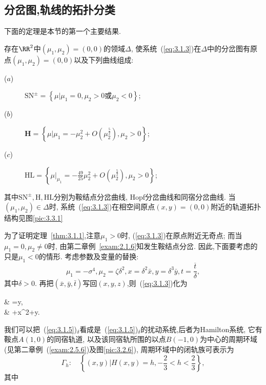 \subsection{分岔图,轨线的拓扑分类}
下面的定理是本节的第一个主要结果.
\begin{theorem}
  \label{thm:3.1.1}
  存在$\RR^2$中$\left(\mu_{1}, \mu_{2}\right)=(0,0)$的领域$\Delta$,
  使系统~(\ref{eq:3.1.3})在$\Delta$中的分岔图有原点$\left(\mu_{1}, \mu_{2}\right)=(0,0)$以及下列曲线组成:
  \begin{description}
  \item[($a$)] $\mathrm{SN}^{ \pm}=\left\{\mu | \mu_{1}=0, \mu_{2}>0 \text {或} \mu_{2}<0\right\}$;
\item[($b$)] $\mathbf{H}=\left\{\mu | \mu_{1}=-\mu_{2}^{2}+O\left(\mu_{2}^{\frac{5}{2}}\right), \mu_{2}>0\right\}$;
\item[($c$)] $\mathrm{HL}=\left\{\left.\mu\right|_{\mu_1}=-\frac{49}{25} \mu_{2}^{2}+O\left(\mu_{2}^{\frac{5}{2}}\right), \mu_{2}>0\right\}$;
\end{description}
其中$\mathrm{SN}^{ \pm}, \mathrm{H}, \mathrm{HL}$分别为鞍结点分岔曲线,
Hopf分岔曲线和同宿分岔曲线.
当$\left(\mu_{1}, \mu_{2}\right) \in \Delta$时,
系统~(\ref{eq:3.1.3})在相空间原点$(x,y)=(0,0)$附近的轨道拓扑结构见图\ref{pic:3.3.1}
\end{theorem}
\par
为了证明定理~\ref{thm:3.1.1},注意$\mu_{1}>0$时,
(\ref{eq:3.1.3})在原点附近无奇点;
而当$\mu_{1}=0, \mu_{2} \neq 0$时,
由第二章例~\ref{exam:2.1.6}知发生鞍结点分岔.
因此,下面要考虑的只是$\mu_{1}<0$的情形.
考虑参数及变量的替换:
\begin{equation}
  \label{eq:3.1.4}
  \mu_{1}=-\sigma^{4}, \mu_{2}=\zeta \delta^{2}, x=\delta^{2} \bar{x}, y=\delta^{3}\bar{y}, t=\frac{\overline{t}}{\delta},
\end{equation}
其中$\delta>0$.
再把$(\bar{x},\bar{y},\bar{t})$写回$(x,y,z)$,则~(\ref{eq:3.1.3})化为

\begin{ode}
  \label{eq:3.1.5}
&  \dxdt=y, \\
&  +x^{2}+ y.
\end{ode}
我们可以把~(\ref{eq:3.1.5})$_{\delta}$看成是~(\ref{eq:3.1.5})$_{\delta}$的扰动系统,后者为Hamilton系统,
它有鞍点$A(1,0)$的同宿轨道,
以及该同宿轨所围的以点$B(-1,0)$为中心的周期环域(见第二章例~(\ref{exam:2.5.6})及图\ref{pic:3.2.6}),
周期环域中的闭轨族可表示为
\begin{equation}
  \label{eq:3.1.6}
  \Gamma_h: \quad\left\{(x, y) | H(x, y)=h,-\frac{2}{3}<h<\frac{2}{3}\right\},
\end{equation}
其中


